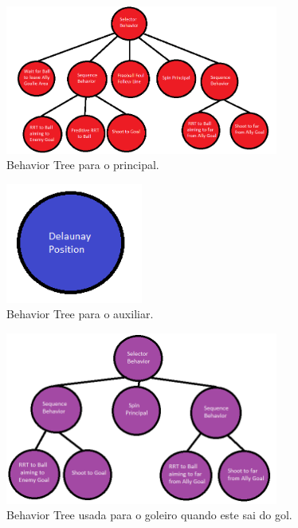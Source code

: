 \documentclass[a4paper,12pt]{article}
\begin{document}
\begin{figure}[H]
	\centering
	\includegraphics[width=0.8\textwidth]{figures/Principal_BT.png}
   	\caption{Behavior Tree para o principal.} \label{fig:text_config_delaunay}
\end{figure}   
   
\begin{figure}[H]
	\centering
	\includegraphics[width=0.4\textwidth]{figures/Auxiliar_BT.png}
   \caption{Behavior Tree para o auxiliar.} \label{fig:text_config_delaunay}
\end{figure}
   
   

   
   
\begin{figure}[H]
	\centering
	\includegraphics[width=0.8\textwidth]{figures/LastGoalierOutOfGoal.png}
   	\caption{Behavior Tree usada para o goleiro quando este sai do gol.} \label{fig:text_config_delaunay}
\end{figure}
\end{document}
